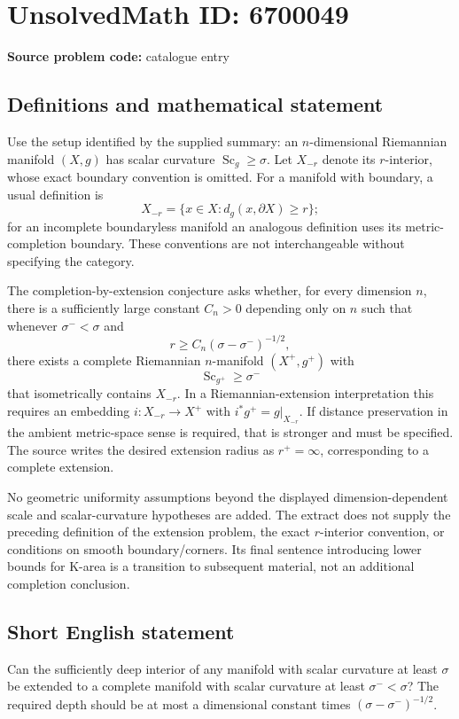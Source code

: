 \documentclass[11pt]{article}
\begin{document}
\section*{UnsolvedMath ID: 6700049}
\textbf{Source problem code:} catalogue entry
\subsection{Definitions and mathematical statement}
Use the setup identified by the supplied summary: an $n$-dimensional Riemannian manifold $(X,g)$ has scalar curvature $\operatorname{Sc}_g\geq\sigma$. Let $X_{-r}$ denote its $r$-interior, whose exact boundary convention is omitted. For a manifold with boundary, a usual definition is
\[
X_{-r}=\{x\in X:d_g(x,\partial X)\geq r\};
\]
for an incomplete boundaryless manifold an analogous definition uses its metric-completion boundary. These conventions are not interchangeable without specifying the category.

The completion-by-extension conjecture asks whether, for every dimension $n$, there is a sufficiently large constant $C_n>0$ depending only on $n$ such that whenever $\sigma^-<\sigma$ and
\[
r\geq C_n(\sigma-\sigma^-)^{-1/2},
\]
there exists a complete Riemannian $n$-manifold $(X^+,g^+)$ with
\[
\operatorname{Sc}_{g^+}\geq\sigma^-
\]
that isometrically contains $X_{-r}$. In a Riemannian-extension interpretation this requires an embedding $i:X_{-r}\to X^+$ with $i^*g^+=g|_{X_{-r}}$. If distance preservation in the ambient metric-space sense is required, that is stronger and must be specified. The source writes the desired extension radius as $r^+=\infty$, corresponding to a complete extension.

No geometric uniformity assumptions beyond the displayed dimension-dependent scale and scalar-curvature hypotheses are added. The extract does not supply the preceding definition of the extension problem, the exact $r$-interior convention, or conditions on smooth boundary/corners. Its final sentence introducing lower bounds for K-area is a transition to subsequent material, not an additional completion conclusion.
\subsection{Short English statement}
Can the sufficiently deep interior of any manifold with scalar curvature at least $\sigma$ be extended to a complete manifold with scalar curvature at least $\sigma^-<\sigma$? The required depth should be at most a dimensional constant times $(\sigma-\sigma^-)^{-1/2}$.
\end{document}

